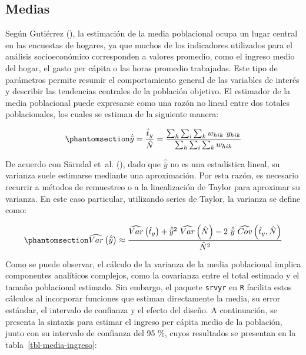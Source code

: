 \documentclass[
  spanish,
  11pt,
  letterpaper,
  oneside,
  open=any]{scrbook}
\begin{document}
\subsection{Medias}\label{estimacion-de-la-media}

Según Gutiérrez (), la estimación de
la media poblacional ocupa un lugar central en las encuestas de hogares,
ya que muchos de los indicadores utilizados para el análisis
socioeconómico corresponden a valores promedio, como el ingreso medio
del hogar, el gasto per cápita o las horas promedio trabajadas. Este
tipo de parámetros permite resumir el comportamiento general de las
variables de interés y describir las tendencias centrales de la
población objetivo. El estimador de la media poblacional puede
expresarse como una razón no lineal entre dos totales poblacionales, los
cuales se estiman de la siguiente manera:

\begin{equation}\protect\phantomsection\label{eq-media-ponderada}{
\hat{\bar{y}}=  \frac{\hat{t}_y}{\hat{N}}  =  \frac{\sum_{h}\sum_{i}\sum_{k} w_{h i k} \ y_{hik}}{\sum_{h}\sum_{i}\sum_{k} w_{h i k}}
}\end{equation}

De acuerdo con Särndal et~al. (),
dado que \(\hat{\bar{y}}\) no es una estadística lineal, su varianza
suele estimarse mediante una aproximación. Por esta razón, es necesario
recurrir a métodos de remuestreo o a la linealización de Taylor para
aproximar su varianza. En este caso particular, utilizando series de
Taylor, la varianza se define como:

\begin{equation}\protect\phantomsection\label{eq-varianza-media}{
\widehat{Var}\left(\hat{\bar{y}}\right)  \approx  \frac{\widehat{Var}\left(\hat{t}_y\right)+\hat{\bar{y}}^{2}\ \widehat{Var}\left(\hat{N}\right)-2\ \hat{\bar{y}} \  \widehat{Cov}\left(\hat{t}_y,\hat{N}\right)}{\hat{N}^{2}}
}\end{equation}

Como se puede observar, el cálculo de la varianza de la media
poblacional implica componentes analíticos complejos, como la covarianza
entre el total estimado y el tamaño poblacional estimado. Sin embargo,
el paquete \texttt{srvyr} en \texttt{R} facilita estos cálculos al
incorporar funciones que estiman directamente la media, su error
estándar, el intervalo de confianza y el efecto del diseño. A
continuación, se presenta la sintaxis para estimar el ingreso per cápita
medio de la población, junto con su intervalo de confianza del 95 \%,
cuyos resultados se presentan en la tabla~\ref{tbl-media-ingreso}:
\end{document}

